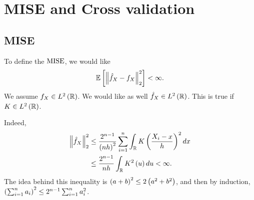 \section{MISE and Cross validation}
\subsection{MISE}
To define the $\mathrm{MISE}$, we would like
\begin{equation*}
	\mathbb{E}\left[\left\| \hat{f}_X - f_X \right\|^2_2\right] < \infty.
\end{equation*}
We assume $f_X\in L^2\left(\mathbb{R}\right)$. We would like as well $\hat{f}_X\in L^2\left(\mathbb{R}\right)$. This is true if $K\in L^2\left(\mathbb{R}\right)$.

Indeed,
\begin{equation*}
	\begin{split}
		\left\| \hat{f}_X \right\|_2^2 &\leq \frac{2^{n-1}}{\left(nh\right)^2} \sum_{i=1}^n \int_{\mathbb{R}} K\left(\frac{X_i -x}{h}\right)^2 dx \\
		&\leq \frac{2^{n-1}}{nh} \int_{\mathbb{R}} K^2\left(u\right) du <\infty.
	\end{split}
\end{equation*}
The idea behind this inequality is $\left(a+b\right)^2 \leq 2 \left(a^2 + b^2\right)$, and then by induction, $\left(\sum_{i=1}^n a_i \right)^2 \leq 2^{n-1} \sum_{i=1}^n a_i^2$.
